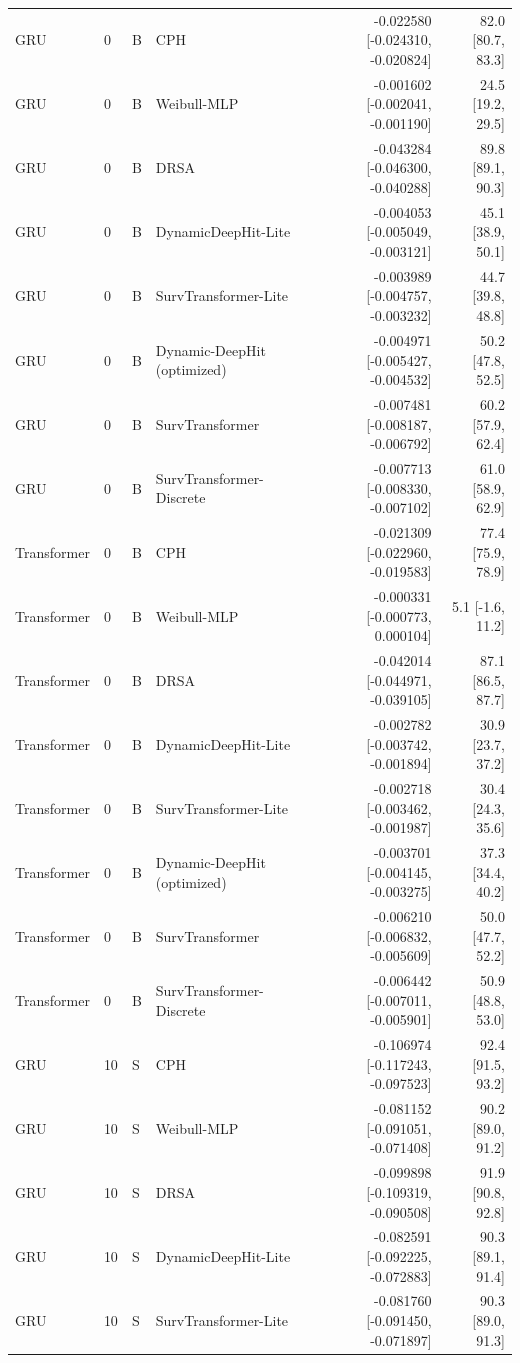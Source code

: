 \begin{longtable}{lll p{3.0cm} rr}
GRU & 0 & B & CPH & -0.022580 [-0.024310, -0.020824] & 82.0 [80.7, 83.3]\\
GRU & 0 & B & Weibull-MLP & -0.001602 [-0.002041, -0.001190] & 24.5 [19.2, 29.5]\\
GRU & 0 & B & DRSA & -0.043284 [-0.046300, -0.040288] & 89.8 [89.1, 90.3]\\
GRU & 0 & B & DynamicDeepHit-Lite & -0.004053 [-0.005049, -0.003121] & 45.1 [38.9, 50.1]\\
GRU & 0 & B & SurvTransformer-Lite & -0.003989 [-0.004757, -0.003232] & 44.7 [39.8, 48.8]\\
GRU & 0 & B & Dynamic-DeepHit (optimized) & -0.004971 [-0.005427, -0.004532] & 50.2 [47.8, 52.5]\\
GRU & 0 & B & SurvTransformer & -0.007481 [-0.008187, -0.006792] & 60.2 [57.9, 62.4]\\
GRU & 0 & B & SurvTransformer-Discrete & -0.007713 [-0.008330, -0.007102] & 61.0 [58.9, 62.9]\\
Transformer & 0 & B & CPH & -0.021309 [-0.022960, -0.019583] & 77.4 [75.9, 78.9]\\
Transformer & 0 & B & Weibull-MLP & -0.000331 [-0.000773, 0.000104] & 5.1 [-1.6, 11.2]\\
Transformer & 0 & B & DRSA & -0.042014 [-0.044971, -0.039105] & 87.1 [86.5, 87.7]\\
Transformer & 0 & B & DynamicDeepHit-Lite & -0.002782 [-0.003742, -0.001894] & 30.9 [23.7, 37.2]\\
Transformer & 0 & B & SurvTransformer-Lite & -0.002718 [-0.003462, -0.001987] & 30.4 [24.3, 35.6]\\
Transformer & 0 & B & Dynamic-DeepHit (optimized) & -0.003701 [-0.004145, -0.003275] & 37.3 [34.4, 40.2]\\
Transformer & 0 & B & SurvTransformer & -0.006210 [-0.006832, -0.005609] & 50.0 [47.7, 52.2]\\
Transformer & 0 & B & SurvTransformer-Discrete & -0.006442 [-0.007011, -0.005901] & 50.9 [48.8, 53.0]\\
GRU & 10 & S & CPH & -0.106974 [-0.117243, -0.097523] & 92.4 [91.5, 93.2]\\
GRU & 10 & S & Weibull-MLP & -0.081152 [-0.091051, -0.071408] & 90.2 [89.0, 91.2]\\
GRU & 10 & S & DRSA & -0.099898 [-0.109319, -0.090508] & 91.9 [90.8, 92.8]\\
GRU & 10 & S & DynamicDeepHit-Lite & -0.082591 [-0.092225, -0.072883] & 90.3 [89.1, 91.4]\\
GRU & 10 & S & SurvTransformer-Lite & -0.081760 [-0.091450, -0.071897] & 90.3 [89.0, 91.3]\\

\end{longtable}
